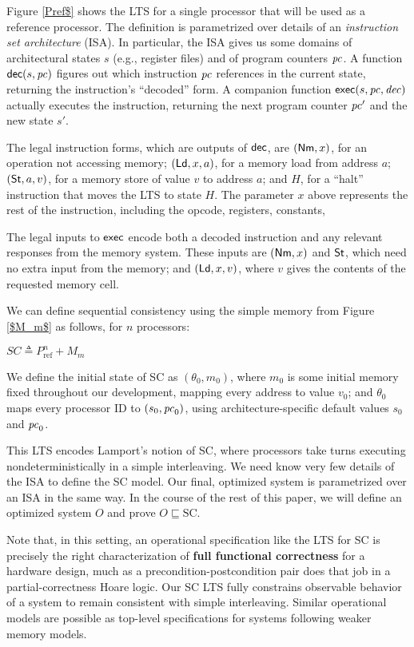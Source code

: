 Figure \ref{Pref$} shows the LTS for a single processor that will be used as a
reference processor.  The definition is parametrized over details of an
\emph{instruction set architecture} (ISA).  In particular, the ISA gives us
some domains of architectural states $s$ (e.g., register files) and of program
counters $\pc$.  A function $\dec(s, \pc)$ figures out which instruction $\pc$
references in the current state, returning the instruction's ``decoded'' form.
A companion function $\exec(s, \pc, \mathit{dec})$ actually executes the
instruction, returning the next program counter $\pc'$ and the new state $s'$.

The legal instruction forms, which are outputs of $\mathsf{dec}$, are $(\mathsf{Nm}, x)$, for
an operation not accessing memory; $(\mathsf{Ld}, x, a)$, for a memory load from
address $a$; $(\mathsf{St}, a, v)$, for a memory store of value $v$ to address $a$; and
$H$, for a ``halt'' instruction that moves the LTS to state $H$. The parameter
$x$ above represents the rest of the instruction, including the
opcode, registers, constants, \etc{}

The legal inputs to $\mathsf{exec}$ encode both a decoded instruction and any relevant
responses from the memory system.  These inputs are $(\mathsf{Nm}, x)$ and $\mathsf{St}$, which
need no extra input from the memory; and $(\mathsf{Ld}, x, v)$, where $v$ gives the
contents of the requested memory cell.

We can define sequential consistency using the simple memory from Figure
\ref{$M_m$} as follows, for $n$ processors:
\begin{defn}
$SC \triangleq P^n_\text{ref} + M_m$
\label{sc}
\end{defn}

We define the initial state of SC as $(\theta_0, m_0)$, where $m_0$ is
some initial memory fixed throughout our development, mapping every
address to value $v_0$; and $\theta_0$ maps every processor ID to
$(s_0, \mathit{pc}_0)$, using architecture-specific default values $s_0$ and
$\mathit{pc}_0$.

This LTS encodes Lamport's notion of SC, where processors take turns executing
nondeterministically in a simple interleaving.  We need know very few details
of the ISA to define the SC model.  Our final, optimized system is parametrized
over an ISA in the same way.  In the course of the rest of this paper, we will
define an optimized system $O$ and prove $O \sqsubseteq \text{SC}$.

Note that, in this setting, an operational specification like the LTS
for SC is precisely the right characterization of \textbf{full functional
  correctness} for a hardware design, much as a
precondition-postcondition pair does that job in a partial-correctness
Hoare logic.  Our SC LTS fully constrains observable behavior of a
system to remain consistent with simple interleaving.  Similar
operational models are possible as top-level specifications for
systems following weaker memory models.


